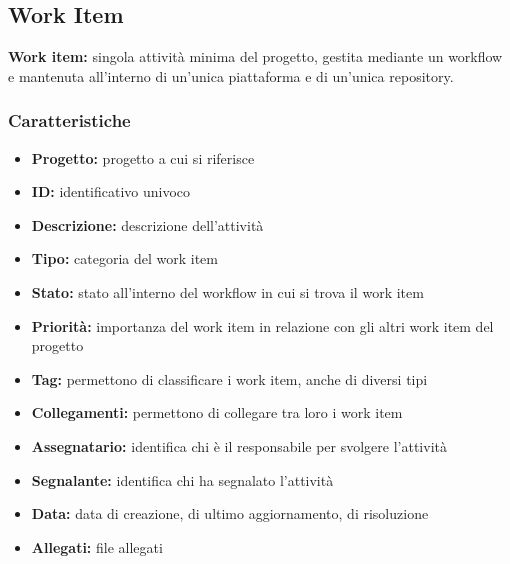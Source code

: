 \subsection{Work Item}
\begin{mdframed}
    \textbf{Work item:} singola attività minima del progetto, gestita mediante un workflow e mantenuta all'interno di un'unica piattaforma e di un'unica repository.
\end{mdframed}

\subsubsection{Caratteristiche}
\begin{itemize}
    \item \textbf{Progetto:} progetto a cui si riferisce
    \item \textbf{ID:} identificativo univoco
    \item \textbf{Descrizione:} descrizione dell'attività
    \item \textbf{Tipo:} categoria del work item
    \item \textbf{Stato:} stato all'interno del workflow in cui si trova il work item
    \item \textbf{Priorità:} importanza del work item in relazione con gli altri work item del progetto
    \item \textbf{Tag:} permettono di classificare i work item, anche di diversi tipi
    \item \textbf{Collegamenti:} permettono di collegare tra loro i work item
    \item \textbf{Assegnatario:} identifica chi è il responsabile per svolgere l'attività
    \item \textbf{Segnalante:} identifica chi ha segnalato l'attività
    \item \textbf{Data:} data di creazione, di ultimo aggiornamento, di risoluzione
    \item \textbf{Allegati:} file allegati
\end{itemize}

